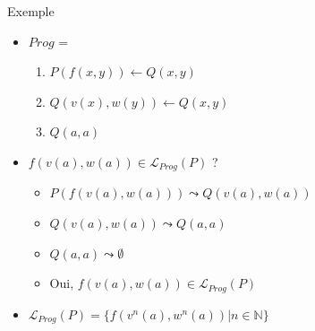 \begin{frame}{Exemple}
  \begin{itemize}[<+->]
  \item $Prog$ =
    \begin{enumerate}
    \item {}$P(f(x,y)) \leftarrow Q(x, y)$ \\
    \item {}$Q(v(x), w(y)) \leftarrow Q(x, y)$ \\
    \item {}$Q(a, a)$
    \end{enumerate}
  \item $f(v(a),w(a)) \in \mathcal{L}_{Prog}(P)$ ?
    \begin{itemize}
    \item $P(f(v(a),w(a))) \leadsto Q(v(a), w(a))$ \\
    \item $Q(v(a), w(a)) \leadsto Q(a, a)$ \\
    \item $Q(a, a) \leadsto \emptyset$
    \item Oui, $f(v(a),w(a)) \in \mathcal{L}_{Prog}(P)$
    \end{itemize}
  \item $\mathcal{L}_{Prog}(P) = \{f(v^n(a),w^n(a)) | n \in \mathbb{N}\}$
  \end{itemize}
\end{frame}

